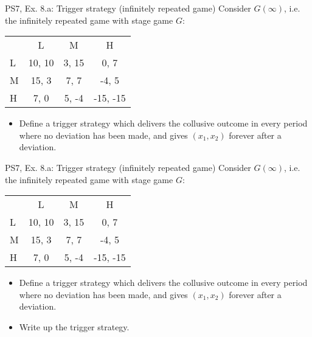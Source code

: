 \begin{frame}{PS7, Ex. 8.a: Trigger strategy (infinitely repeated game)}
    Consider $G(\infty)$, i.e. the infinitely repeated game with stage game $G$: \vspace{-6pt}
    \begin{table}
      \begin{tabular}{l|c|c|c|}
        \multicolumn{1}{c}{} & \multicolumn{1}{c}{L} & \multicolumn{1}{c}{M} & \multicolumn{1}{c}{H} \\\cline{2-4}
        L & 10, 10 & 3, 15 & 0, 7 \\\cline{2-4}
        M & 15, 3 & 7, 7 & -4, 5 \\\cline{2-4}
        H & 7, 0 & 5, -4 & -15, -15 \\\cline{2-4}
      \end{tabular}
    \end{table}
    \begin{itemize}
      \item[(a)] Define a trigger strategy which delivers the collusive outcome in every period where no deviation has been made, and gives $(x_1, x_2)$ forever after a deviation.
    \end{itemize}
  \begin{multicols}{2}
    \vfill\null\columnbreak
    \vfill\null
  \end{multicols}
\end{frame}
\begin{frame}{PS7, Ex. 8.a: Trigger strategy (infinitely repeated game)}
    Consider $G(\infty)$, i.e. the infinitely repeated game with stage game $G$: \vspace{-6pt}
    \begin{table}
      \begin{tabular}{l|c|c|c|}
        \multicolumn{1}{c}{} & \multicolumn{1}{c}{L} & \multicolumn{1}{c}{M} & \multicolumn{1}{c}{H} \\\cline{2-4}
        L & 10, 10 & 3, 15 & 0, 7 \\\cline{2-4}
        M & 15, 3 & 7, 7 & -4, 5 \\\cline{2-4}
        H & 7, 0 & 5, -4 & -15, -15 \\\cline{2-4}
      \end{tabular}
    \end{table}
    \begin{itemize}
      \item[(a)] Define a trigger strategy which delivers the collusive outcome in every period where no deviation has been made, and gives $(x_1, x_2)$ forever after a deviation.
    \end{itemize}
  \begin{multicols}{2}
    \begin{itemize}
      \item[(Step a)] Write up the trigger strategy.
    \end{itemize}
    \vfill\null\columnbreak
    \vfill\null
  \end{multicols}
\end{frame}
